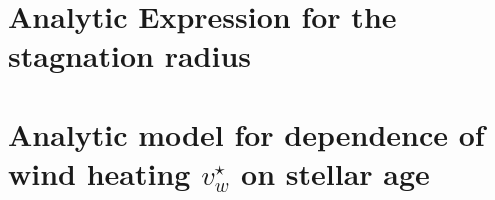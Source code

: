 \documentclass[usenatbib,fleqn]{mn2e}
\newcommand{\vwO}{v_{w}}
\begin{document}
  \clearpage
  \appendix
  \section{Analytic Expression for the stagnation radius}
  \label{app:rs}
  


\section{Analytic model for dependence of wind heating $\vwO^{\star}$ on stellar age}
\label{app:windheat}


  \footnotesize{
    
    
  }
\end{document}
